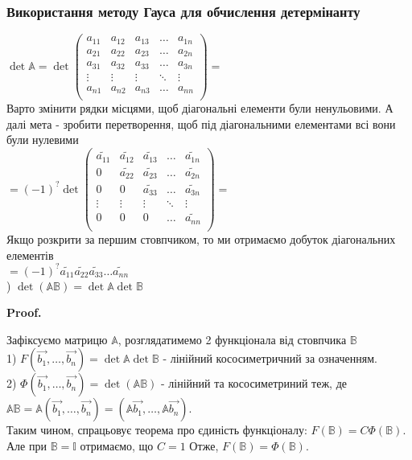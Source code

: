 \documentclass[a4paper, 10pt]{article}
\makeatletter
\theoremstyle{theoremdd}
\renewenvironment{proof}[1][Proof.\\]{\par
\pushQED{\hfill \qed}%
\normalfont \topsep6\p@\@plus6\p@\relax
\trivlist
\item\relax
{\bfseries
#1\@addpunct{.}}\hspace\labelsep\ignorespaces
}{%
\popQED\endtrivlist\@endpefalse
}
\makeatother
\begin{document}
\subsubsection*{Використання методу Гауса для обчислення детермінанту}
$\det \mathbb{A} = \det \begin{pmatrix} 
a_{11} & a_{12} & a_{13} & \dots & a_{1n} \\
a_{21} & a_{22} & a_{23} & \dots & a_{2n} \\
a_{31} & a_{32} & a_{33} & \dots & a_{3n} \\
\vdots & \vdots & \vdots & \ddots & \vdots \\
a_{n1} & a_{n2} & a_{n3} & \dots & a_{nn} \\
\end{pmatrix} = $\\
Варто змінити рядки місцями, щоб діагональні елементи були ненульовими. А далі мета - зробити перетворення, щоб під діагональними елементами всі вони були нулевими\\
$= (-1)^? \det \begin{pmatrix} 
\tilde{a_{11}} & \tilde{a_{12}} & \tilde{a_{13}} & \dots & \tilde{a_{1n}} \\
0 & \tilde{a_{22}} & \tilde{a_{23}} & \dots & \tilde{a_{2n}} \\
0 & 0 & \tilde{a_{33}} & \dots & \tilde{a_{3n}} \\
\vdots & \vdots & \vdots & \ddots & \vdots \\
0 & 0 & 0 & \dots & \tilde{a_{nn}} \\
\end{pmatrix} = $\\
Якщо розкрити за першим стовпчиком, то ми отримаємо добуток діагональних елементів\\
$ = (-1)^? \tilde{a_{11}}\tilde{a_{22}}\tilde{a_{33}}\dots \tilde{a_{nn}}$
\bigskip \\

) $\det (\mathbb{A} \mathbb{B}) = \det \mathbb{A} \det \mathbb{B}$
\begin{proof}
Зафіксуємо матрицю $\mathbb{A}$, розглядатимемо 2 функціонала від стовпчика $\mathbb{B}$\\
1) $F(\vec{b_1},\dots, \vec{b_n}) = \det \mathbb{A} \det \mathbb{B}$ - лінійний кососиметричний за означенням.\\
2) $\Phi(\vec{b_1},\dots, \vec{b_n}) = \det(\mathbb{A}\mathbb{B})$ - лінійний та кососиметриний теж, де $\mathbb{A}\mathbb{B} = \mathbb{A}(\vec{b_1},\dots, \vec{b_n}) = (\mathbb{A}\vec{b_1},\dots, \mathbb{A}\vec{b_n})$.\\
Таким чином, спрацьовує теорема про єдиність функціоналу: $F(\mathbb{B}) = C \Phi(\mathbb{B})$.\\
Але при $\mathbb{B} = \mathbb{I}$ отримаємо, що $C=1$ Отже, $F(\mathbb{B}) = \Phi(\mathbb{B})$.
\end{proof}
\end{document}
